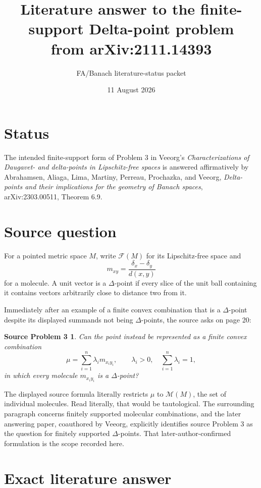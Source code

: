 \documentclass[11pt]{article}
\title{Literature answer to the finite-support Delta-point problem\\
from arXiv:2111.14393}
\author{FA/Banach literature-status packet}
\date{11 August 2026}
\newtheorem*{sourceproblem}{Source Problem 3}
\newcommand{\F}{\mathcal F}
\newcommand{\M}{\mathcal M}
\begin{document}
\maketitle

\section*{Status}

The intended finite-support form of Problem 3 in Veeorg's
\emph{Characterizations of Daugavet- and delta-points in Lipschitz-free
spaces} is answered affirmatively by Abrahamsen, Aliaga, Lima, Martiny,
Perreau, Prochazka, and Veeorg, \emph{Delta-points and their implications for
the geometry of Banach spaces}, arXiv:2303.00511, Theorem 6.9.

\section*{Source question}

For a pointed metric space \(M\), write \(\F(M)\) for its Lipschitz-free
space and
\[
 m_{xy}=\frac{\delta_x-\delta_y}{d(x,y)}
\]
for a molecule.  A unit vector is a \(\Delta\)-point if every slice of the
unit ball containing it contains vectors arbitrarily close to distance two
from it.

Immediately after an example of a finite convex combination that is a
\(\Delta\)-point despite its displayed summands not being \(\Delta\)-points,
the source asks on page 20:

\begin{sourceproblem}
Can the point instead be represented as a finite convex combination
\[
  \mu=\sum_{i=1}^n\lambda_i m_{x_i y_i},
  \qquad \lambda_i>0,\quad \sum_{i=1}^n\lambda_i=1,
\]
in which every molecule \(m_{x_i y_i}\) is a \(\Delta\)-point?
\end{sourceproblem}

The displayed source formula literally restricts \(\mu\) to \(\M(M)\), the
set of individual molecules.  Read literally, that would be tautological.
The surrounding paragraph concerns finitely supported molecular
combinations, and the later answering paper, coauthored by Veeorg, explicitly
identifies source Problem 3 as the question for finitely supported
\(\Delta\)-points.  That later-author-confirmed formulation is the scope
recorded here.

\section*{Exact literature answer}
\end{document}
